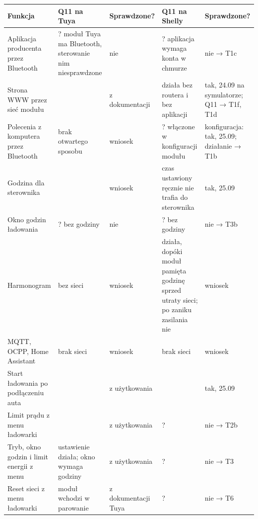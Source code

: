 \documentclass[11pt,a4paper]{article}
\begin{document}
\begin{longtable}{>{\raggedright\arraybackslash}p{3.73cm}>{\raggedright\arraybackslash}p{2.56cm}>{\raggedright\arraybackslash}p{2.35cm}>{\raggedright\arraybackslash}p{3.23cm}>{\raggedright\arraybackslash}p{2.52cm}}
\toprule
\rowcolor{apteallight}\textbf{Funkcja} & \textbf{Q11 na Tuya} & \textbf{Sprawdzone?} & \textbf{Q11 na Shelly} & \textbf{Sprawdzone?} \\
\midrule\endhead
\bottomrule\endfoot
Aplikacja producenta przez Bluetooth & ? moduł Tuya ma Bluetooth, sterowanie nim niesprawdzone & nie & ? aplikacja wymaga konta w chmurze & nie {\symbolfont→} T1c \\
Strona WWW przez sieć modułu & \leavevmode{\symbolfont\color{apred}\textbf{✘}} & z dokumentacji & \leavevmode{\symbolfont\color{apamber}\textbf{◐}} działa bez routera i bez aplikacji & tak, 24.09 na symulatorze; Q11 {\symbolfont→} T1f, T1d \\
Polecenia z komputera przez Bluetooth & \leavevmode{\symbolfont\color{apred}\textbf{✘}} brak otwartego sposobu & wniosek & ? włączone w konfiguracji modułu & konfiguracja: tak, 25.09; działanie {\symbolfont→} T1b \\
Godzina dla sterownika & \leavevmode{\symbolfont\color{apred}\textbf{✘}} & wniosek & \leavevmode{\symbolfont\color{apred}\textbf{✘}} czas ustawiony ręcznie nie trafia do sterownika & tak, 25.09 \\
Okno godzin ładowania & ? bez godziny & nie & ? bez godziny & nie {\symbolfont→} T3b \\
Harmonogram & \leavevmode{\symbolfont\color{apred}\textbf{✘}} bez sieci & wniosek & \leavevmode{\symbolfont\color{apamber}\textbf{◐}} działa, dopóki moduł pamięta godzinę sprzed utraty sieci; po zaniku zasilania nie & wniosek \\
MQTT, OCPP, Home Assistant & \leavevmode{\symbolfont\color{apred}\textbf{✘}} brak sieci & wniosek & \leavevmode{\symbolfont\color{apred}\textbf{✘}} brak sieci & wniosek \\
Start ładowania po podłączeniu auta & \leavevmode{\symbolfont\color{apgreen}\textbf{✔}} & z użytkowania & \leavevmode{\symbolfont\color{apgreen}\textbf{✔}} & tak, 25.09 \\
Limit prądu z menu ładowarki & \leavevmode{\symbolfont\color{apgreen}\textbf{✔}} & z użytkowania & ? & nie {\symbolfont→} T2b \\
Tryb, okno godzin i limit energii z menu & \leavevmode{\symbolfont\color{apgreen}\textbf{✔}} ustawienie działa; okno wymaga godziny & z użytkowania & ? & nie {\symbolfont→} T3 \\
Reset sieci z menu ładowarki & \leavevmode{\symbolfont\color{apgreen}\textbf{✔}} moduł wchodzi w parowanie & z dokumentacji Tuya & ? & nie {\symbolfont→} T6 \\
\end{longtable}
\end{document}
